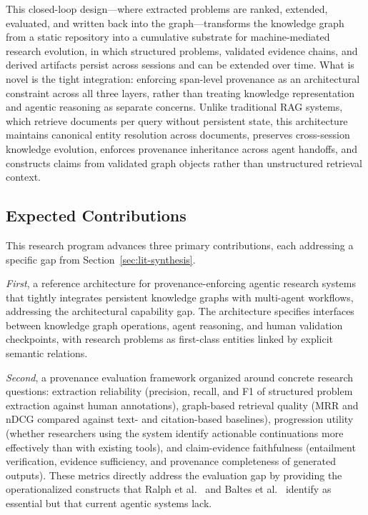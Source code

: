 This closed-loop design---where extracted problems are ranked, extended, evaluated, and written back into the graph---transforms the knowledge graph from a static repository into a cumulative substrate for machine-mediated research evolution, in which structured problems, validated evidence chains, and derived artifacts persist across sessions and can be extended over time. What is novel is the tight integration: enforcing span-level provenance as an architectural constraint across all three layers, rather than treating knowledge representation and agentic reasoning as separate concerns. Unlike traditional RAG systems, which retrieve documents per query without persistent state, this architecture maintains canonical entity resolution across documents, preserves cross-session knowledge evolution, enforces provenance inheritance across agent handoffs, and constructs claims from validated graph objects rather than unstructured retrieval context.

\subsection{Expected Contributions}
\label{sec:proposal-contributions}

This research program advances three primary contributions, each addressing a specific gap from Section~\ref{sec:lit-synthesis}.

\emph{First}, a reference architecture for provenance-enforcing agentic research systems that tightly integrates persistent knowledge graphs with multi-agent workflows, addressing the architectural capability gap. The architecture specifies interfaces between knowledge graph operations, agent reasoning, and human validation checkpoints, with research problems as first-class entities linked by explicit semantic relations.

\emph{Second}, a provenance evaluation framework organized around concrete research questions: extraction reliability (precision, recall, and F1 of structured problem extraction against human annotations), graph-based retrieval quality (MRR and nDCG compared against text- and citation-based baselines), progression utility (whether researchers using the system identify actionable continuations more effectively than with existing tools), and claim-evidence faithfulness (entailment verification, evidence sufficiency, and provenance completeness of generated outputs). These metrics directly address the evaluation gap by providing the operationalized constructs that Ralph et al.~\cite{ralph2021empirical} and Baltes et al.~\cite{baltes2025guidelines} identify as essential but that current agentic systems lack.


